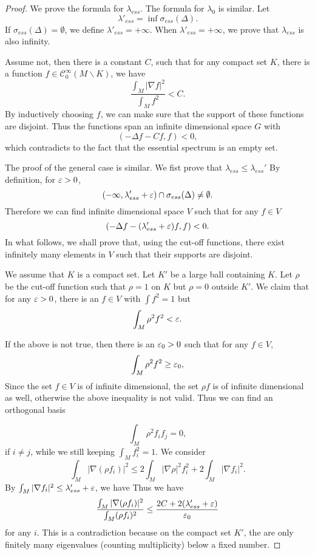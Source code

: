 \begin{proof} We prove the formula for $\lambda_{ess}$.
The formula for $\lambda_0$ is similar.
Let 
\[
\lambda'_{ess}=\inf \sigma_{ess}(\Delta).
\]
If $\sigma_{ess}(\Delta)=\emptyset$, we define $\lambda'_{ess}=+\infty$. 
When $\lambda'_{ess}=+\infty$,  we prove that $\lambda_{ess}$ is also infinity. 

Assume not, then there is a constant $C$, such that for any compact set $K$, there is a function $f\in \mathcal C_0^\infty(M\backslash K)$, we have
\[
\frac{\int_M |\nabla f|^2}{\int_M f^2}<C.
\]
By inductively choosing $f$, we can make sure that the support of these functions are disjoint. Thus the functions span an infinite dimensional space $G$ with
\[
(-\Delta f-Cf,f)<0,
\]
which contradicts to the fact that the essential spectrum is an empty set.


The proof of the general case is similar. We fist prove that $\lambda_{ess}\leq\lambda_{ess}'$
By  definition, for $\varepsilon>0$, 
\[
(-\infty,\lambda_{ess}'+\varepsilon)\cap \sigma_{ess}(\Delta)\neq\emptyset.
\]
Therefore we can find infinite dimensional space $V$ such that for any $f\in V$
\[
(-\Delta f-(\lambda_{ess}'+\varepsilon) f, f)<0.
\]
In what follows, we shall prove that, using the cut-off functions, there exist infinitely many elements in $V$ such that their supports are disjoint. 




We assume that $K$ is a compact set. Let $K'$ be a large ball containing $K$. Let $\rho$ be the cut-off function such that $\rho=1$ on $K$ but $\rho=0$ outside $K'$. We claim that  for any $\varepsilon>0$, there is an $f\in V$ with $\int f^2=1$ but
\[
\int_M\rho^2f^2<\varepsilon.
\]

If the above is not true, then there is an $\varepsilon_0>0$ such that for any $f\in V$,
\[
\int_M\rho^2f^2\geq\varepsilon_0,
\]
Since the set $f\in V$ is of infinite dimensional, the set $\rho f$ is of infinite dimensional as well, otherwise the above inequality is not valid. Thus we can find an orthogonal basis

\[
\int_M\rho^2f_if_j=0,
\]
if $i\neq j$, while we still keeping $\int_Mf_i^2=1$. We consider
\[
\int_M|\nabla(\rho f_i)|^2\leq 2\int_M|\nabla \rho|^2 f_i^2+2\int_M|\nabla f_i|^2.
\]
By $\int_M|\nabla f_i|^2\leq \lambda'_{ess}+\varepsilon$, we have
Thus we have
\[
\frac{\int_M|\nabla(\rho f_i)|^2}{\int_M(\rho f_i)^2}
\leq \frac{2C+2(\lambda_{ess}'+\varepsilon)}{\varepsilon_0}
\]
for any $i$.  This is a contradiction because on the compact
set $K'$, the are only finitely many eigenvalues (counting multiplicity) below a fixed number.


\end{proof}
